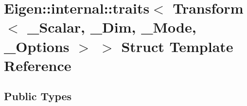 \hypertarget{struct_eigen_1_1internal_1_1traits_3_01_transform_3_01___scalar_00_01___dim_00_01___mode_00_01___options_01_4_01_4}{}\section{Eigen\+:\+:internal\+:\+:traits$<$ Transform$<$ \+\_\+\+Scalar, \+\_\+\+Dim, \+\_\+\+Mode, \+\_\+\+Options $>$ $>$ Struct Template Reference}
\label{struct_eigen_1_1internal_1_1traits_3_01_transform_3_01___scalar_00_01___dim_00_01___mode_00_01___options_01_4_01_4}
\subsection*{Public Types}
